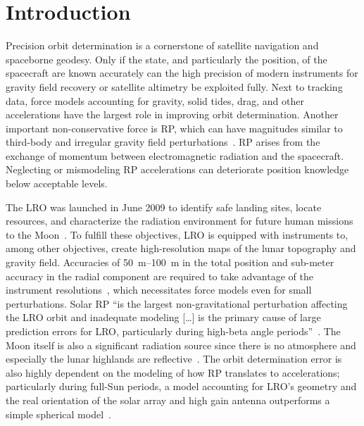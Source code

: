 \section{Introduction}
\label{sec:introduction}

Precision orbit determination is a cornerstone of satellite navigation and spaceborne geodesy. Only if the state, and particularly the position, of the spacecraft are known accurately can the high precision of modern instruments for gravity field recovery or satellite altimetry be exploited fully. Next to tracking data, force models accounting for gravity, solid tides, drag, and other accelerations have the largest role in improving orbit determination. Another important non-conservative force is \acrfull{RP}, which can have magnitudes similar to third-body and irregular gravity field perturbations~\cite{Montenbruck2000}. \gls{RP} arises from the exchange of momentum between electromagnetic radiation and the spacecraft. Neglecting or mismodeling \gls{RP} accelerations can deteriorate position knowledge below acceptable levels.

The \acrfull{LRO} was launched in June 2009 to identify safe landing sites, locate resources, and characterize the radiation environment for future human missions to the Moon~\cite{Tooley2010}. To fulfill these objectives, \gls{LRO} is equipped with instruments to, among other objectives, create high-resolution maps of the lunar topography and gravity field. Accuracies of \qtyrange{50}{100}{\m} in the total position and sub-meter accuracy in the radial component are required to take advantage of the instrument resolutions~\cite{Chin2007,Zuber2009}, which necessitates force models even for small perturbations. Solar \gls{RP} \enquote{is the largest non-gravitational perturbation affecting the LRO orbit and inadequate modeling [\ldots] is the primary cause of large prediction errors for LRO, particularly during high-beta angle periods}~\cite{Slojkowski2015}. The Moon itself is also a significant radiation source since there is no atmosphere and especially the lunar highlands are reflective~\cite{Floberghagen1999}. The orbit determination error is also highly dependent on the modeling of how \gls{RP} translates to accelerations; particularly during full-Sun periods, a model accounting for \gls{LRO}'s geometry and the real orientation of the solar array and high gain antenna outperforms a simple spherical model~\cite{Slojkowski2014}.
 
